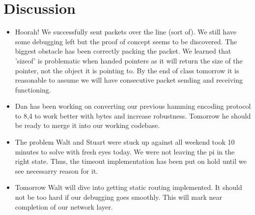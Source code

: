 \documentclass{article}
\begin{document}
\section*{Discussion}
\begin{itemize}
    \item Hoorah! We successfully sent packets over the line (sort of). We still have some debugging left but the proof of concept seems to be discovered.
    The biggest obstacle has been correctly packing the packet. We learned that 'sizeof' is problematic when handed pointers as it will return the size
    of the pointer, not the object it is pointing to. By the end of class tomorrow it is reasonable to assume we will have consecutive packet sending and receiving
    functioning. 
    \item Dan has been working on converting our previous hamming encoding protocol to 8,4 to work better with bytes and increase robustness. Tomorrow he should
    be ready to merge it into our working codebase. 
    \item  The problem Walt and Stuart were stuck up against all weekend took 10 minutes to solve with fresh eyes today. We were not leaving the pi in the right
    state. Thus, the timeout implementation has been put on hold until we see necessarry reason for it.
    \item Tomorrow Walt will dive into getting static routing implemented. It should not be too hard if our debugging goes smoothly. This will mark near completion
    of our network layer.
\end{itemize}

\end{document}
